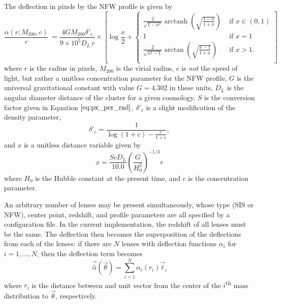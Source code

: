 \documentclass[10pt,twoside]{article}
\theoremstyle{definition}
\theoremstyle{exercise}
\begin{document}
\begin{description}
    The deflection in pixels by the NFW profile is given by
    \begin{equation}
      \frac{\alpha(r; M_{200}, c)}{r} \ =  \frac{4GM_{200}\delta'_c}{9\times 10^5 D_L\, r} \times \left[\log \frac{x}{2} +  
      \begin{cases}
        \frac{2}{\sqrt{1-x^2}}\operatorname{arctanh}\left( \sqrt{\frac{1-x}{1+x}} \right) & \text{ if $x \in (0, 1)$}\\
        1 & \text{ if $x=1$}\\
        \frac{2}{\sqrt{x^2-1}}\arctan\left( \sqrt{\frac{x-1}{1+x}} \right) & \text{ if $x > 1$.}\\
      \end{cases}
      \right]
      \label{eq:NFW_deflection}
    \end{equation}
    where $r$ is the radius in pixels, $M_{200}$ is the virial radius, $c$ is \textit{not} the speed of light, but rather a unitless concentration parameter for the NFW profile, $G$ is the universal gravitational constant with value $G = 4.302$ in these units, $D_L$ is the angular diameter distance of the cluster for a given cosmology, $S$ is the conversion factor given in Equation $\eqref{eq:px_per_rad}$, $\delta'_c$ is a slight modification of the density parameter, 
    \begin{equation}
      \delta'_c = \frac{1}{\log(1+c)-\frac{c}{1+c}},
        \label{eq:mod_delta_c}
    \end{equation}
    and $x$ is a unitless distance variable given by
    \begin{equation}
      x = \frac{Sc D_L}{10.0}\left(\frac{G}{H_0^2}\right)^{-1/3}r
      \label{eq:unitless_x}
    \end{equation}
    where $H_0$ is the Hubble constant at the present time, and $c$ is the concentration parameter.
\end{description}

An arbitrary number of lenses may be present simultaneously, whose type (SIS or NFW), center point, redshift, and profile parameters are all specified by a configuration file. In the current implementation, the redshift of all lenses must be the same. The deflection then becomes the superposition of the deflections from each of the lenses: if there are $N$ lenses with deflection functions $\alpha_i$ for $i = 1,\dots, N$, then the deflection term becomes
\begin{equation}
  \vec{\hat{\alpha}}(\vec{\theta}) = \sum_{i=1}^N \alpha_i(r_i) \vec{\hat{r}}_i
  \label{eq:superposition_lens_eq}
\end{equation}
where $r_i$ is the distance between and unit vector from the center of the $i$\textsuperscript{th} mass distribution to $\vec{\theta}$, respectively.
\end{document}
